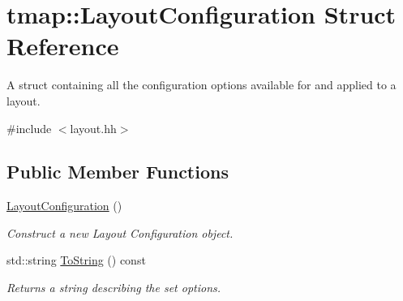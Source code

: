\hypertarget{structtmap_1_1LayoutConfiguration}{}\section{tmap\+:\+:Layout\+Configuration Struct Reference}
\label{structtmap_1_1LayoutConfiguration}


A struct containing all the configuration options available for and applied to a layout.  




{\ttfamily \#include $<$layout.\+hh$>$}

\subsection*{Public Member Functions}
\begin{DoxyCompactItemize}
\item 
\mbox{\label{structtmap_1_1LayoutConfiguration_a45335a69efe4408b49283554a3bb8875}} 
\hyperlink{structtmap_1_1LayoutConfiguration_a45335a69efe4408b49283554a3bb8875}{Layout\+Configuration} ()
\begin{DoxyCompactList}\small\item\em Construct a new Layout Configuration object. \end{DoxyCompactList}\item 
std\+::string \hyperlink{structtmap_1_1LayoutConfiguration_a498341508ea4806795f44e376af18e11}{To\+String} () const
\begin{DoxyCompactList}\small\item\em Returns a string describing the set options. \end{DoxyCompactList}\end{DoxyCompactItemize}
